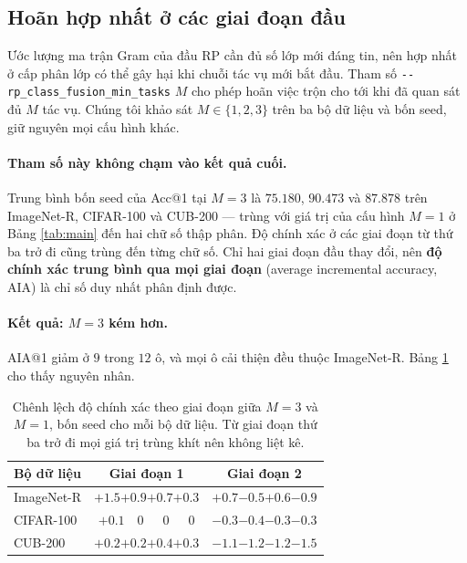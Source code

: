 \documentclass[11pt,a4paper]{article}
\begin{document}
\subsection{Hoãn hợp nhất ở các giai đoạn đầu}
\label{sec:mintasks}

Ước lượng ma trận Gram của đầu RP cần đủ số lớp mới đáng tin, nên hợp nhất ở cấp
phân lớp có thể gây hại khi chuỗi tác vụ mới bắt đầu. Tham số
\texttt{-{}-rp\_class\_fusion\_min\_tasks} $M$ cho phép hoãn việc trộn cho tới
khi đã quan sát đủ $M$ tác vụ. Chúng tôi khảo sát $M \in \{1, 2, 3\}$ trên ba bộ
dữ liệu và bốn seed, giữ nguyên mọi cấu hình khác.

\paragraph{Tham số này không chạm vào kết quả cuối.}
Trung bình bốn seed của Acc@1 tại $M = 3$ là $75.180$, $90.473$ và $87.878$ trên
ImageNet-R, CIFAR-100 và CUB-200 --- trùng với giá trị của cấu hình $M = 1$ ở
Bảng \ref{tab:main} đến hai chữ số thập phân. Độ chính xác ở các giai đoạn từ
thứ ba trở đi cũng trùng đến từng chữ số. Chỉ hai giai đoạn đầu thay đổi, nên
\textbf{độ chính xác trung bình qua mọi giai đoạn} (average incremental
accuracy, AIA) là chỉ số duy nhất phân định được.

\paragraph{Kết quả: $M = 3$ kém hơn.}
AIA@1 giảm ở $9$ trong $12$ ô, và mọi ô cải thiện đều thuộc ImageNet-R. Bảng
\ref{tab:mintasks} cho thấy nguyên nhân.

\begin{table}[H]
\centering
\caption{Chênh lệch độ chính xác theo giai đoạn giữa $M = 3$ và $M = 1$, bốn
seed cho mỗi bộ dữ liệu. Từ giai đoạn thứ ba trở đi mọi giá trị trùng khít nên
không liệt kê.}
\label{tab:mintasks}
\begin{tabular}{@{}lcc@{}}
\toprule
Bộ dữ liệu & Giai đoạn 1 & Giai đoạn 2 \\
\midrule
ImageNet-R & $+1.5$\quad $+0.9$\quad $+0.7$\quad $+0.3$
           & $+0.7$\quad $-0.5$\quad $+0.6$\quad $-0.9$ \\
CIFAR-100  & $+0.1$\quad\ \ $0$\quad\ \ \ $0$\quad\ \ \ $0$
           & $-0.3$\quad $-0.4$\quad $-0.3$\quad $-0.3$ \\
CUB-200    & $+0.2$\quad $+0.2$\quad $+0.4$\quad $+0.3$
           & $-1.1$\quad $-1.2$\quad $-1.2$\quad $-1.5$ \\
\bottomrule
\end{tabular}
\end{table}
\end{document}
